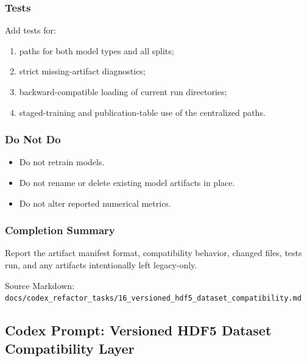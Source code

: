 \documentclass[
]{article}
\providecommand{\tightlist}{%
  \setlength{\itemsep}{0pt}\setlength{\parskip}{0pt}}
\begin{document}
\hypertarget{tests-13}{%
\subsubsection{Tests}\label{tests-13}}

Add tests for:

\begin{enumerate}
\def\labelenumi{\arabic{enumi}.}
\tightlist
\item
  paths for both model types and all splits;
\item
  strict missing-artifact diagnostics;
\item
  backward-compatible loading of current run directories;
\item
  staged-training and publication-table use of the centralized paths.
\end{enumerate}

\hypertarget{do-not-do-4}{%
\subsubsection{Do Not Do}\label{do-not-do-4}}

\begin{itemize}
\tightlist
\item
  Do not retrain models.
\item
  Do not rename or delete existing model artifacts in place.
\item
  Do not alter reported numerical metrics.
\end{itemize}

\hypertarget{completion-summary-4}{%
\subsubsection{Completion Summary}\label{completion-summary-4}}

Report the artifact manifest format, compatibility behavior, changed
files, tests run, and any artifacts intentionally left legacy-only.

Source Markdown:
\texttt{docs/codex\_refactor\_tasks/16\_versioned\_hdf5\_dataset\_compatibility.md}

\hypertarget{codex-prompt-versioned-hdf5-dataset-compatibility-layer}{%
\subsection{Codex Prompt: Versioned HDF5 Dataset Compatibility
Layer}\label{codex-prompt-versioned-hdf5-dataset-compatibility-layer}}
\end{document}
